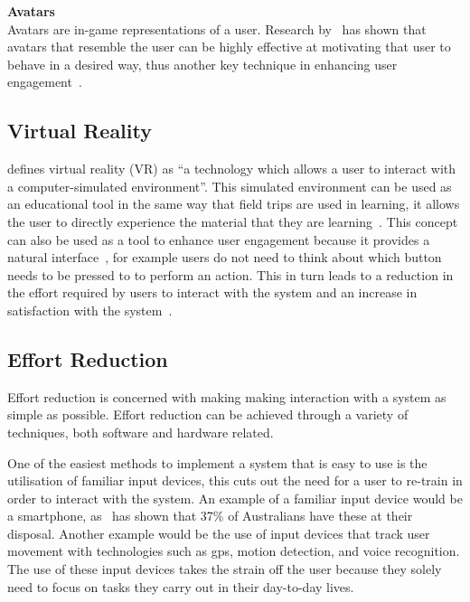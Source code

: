 \documentclass[a4paper,12pt]{article}
\begin{document}
\par
\textbf{Avatars}\\
Avatars are in-game representations of a user. 
Research by~\citet{self-modeling} has shown that avatars that resemble the user can be highly effective at motivating that user to behave in a desired way, thus another key technique in enhancing user engagement~\citep{bread-and-games}.

\subsection{Virtual Reality}\label{sec:virtual-reality}
\citet{vr-unity3d} defines virtual reality (VR) as ``a technology which allows a user to interact with a computer-simulated environment''. 
This simulated environment can be used as an educational tool in the same way that field trips are used in learning, it allows the user to directly experience the material that they are learning~\citep{virtual-reality}.
This concept can also be used as a tool to enhance user engagement because it provides a natural interface~\citep{virtual-reality}, for example users do not need to think about which button needs to be pressed to to perform an action. 
This in turn leads to a reduction in the effort required by users to interact with the system and an increase in satisfaction with the system~\citep{virtual-reality,vr-unity3d}.

\subsection{Effort Reduction}\label{sec:effort-reduction}
Effort reduction is concerned with making making interaction with a system as simple as possible. 
Effort reduction can be achieved through a variety of techniques, both software and hardware related.

\par 
One of the easiest methods to implement a system that is easy to use is the utilisation of familiar input devices, this cuts out the need for a user to re-train in order to interact with the system. 
An example of a familiar input device would be a smartphone, as~\citet{smartphone-use-in-au} has shown that 37\% of Australians have these at their disposal. 
Another example would be the use of input devices that track user movement with  technologies such as gps, motion detection, and voice recognition. 
The use of these input devices takes the strain off the user because they solely need to focus on tasks they carry out in their day-to-day lives.
\end{document}
